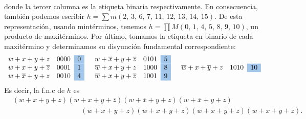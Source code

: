 \begin{myexample}
$$\begin{array}{llr}
    \end{array}$$
    donde la tercer columna es la etiqueta binaria respectivamente. En consecuencia, también podemos escribir $\displaystyle h = \sum m (2, \, 3, \, 6, \, 7, \, 11, \, 12, \, 13, \, 14, \, 15)$. De esta representación, usando mintérminos, tenemos $\displaystyle h = \prod M (0, \, 1, \, 4, \, 5, \, 8, \, 9, \, 10)$, un producto de maxitérminos. Por último, tomamos la etiqueta en binario de cada maxitérmino y determinamos su disyunción fundamental correspondiente:
    $$\begin{array}{llr}
        w+x+y+z & 0000 & \cellcolor{DodgerBlue3!40}{0} \\
        w+x+y+\overline{z} & 0001 & \cellcolor{DodgerBlue3!40}{1} \\
        w+\overline{x}+y+z & 0010 & \cellcolor{DodgerBlue3!40}{4}
    \end{array} \quad \begin{array}{llr}
        w+\overline{x}+y+\overline{z} & 0101 & \cellcolor{DodgerBlue3!40}{5} \\
        \overline{w}+x+y+z & 1000 & \cellcolor{DodgerBlue3!40}{8} \\
        \overline{w}+x+y+\overline{z} & 1001 & \cellcolor{DodgerBlue3!40}{9}
    \end{array} \quad \begin{array}{llr}
        \overline{w}+x+\overline{y}+z & 1010 & \cellcolor{DodgerBlue3!40}{10}
    \end{array}$$
    Es decir, la f.n.c de $h$ es
    \begin{align*}
        & (w+x+y+z)(w+x+y+\overline{z})(w+\overline{x}+y+z)(w+\overline{x}+y+z) \\
        & \hspace{4cm} (w+\overline{x}+y+\overline{z})(\overline{w}+x+y+z)(\overline{w}+x+y+\overline{z})(\overline{w}+x+\overline{y}+z).
    \end{align*}
\end{myexample}